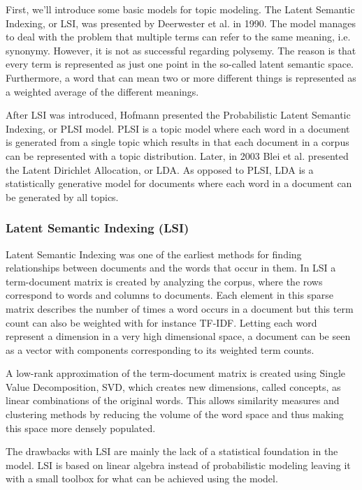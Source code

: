 \documentclass[12pt]{report}
\begin{document}
First, we'll introduce some basic models for topic modeling. The Latent Semantic
Indexing, or LSI, was presented by Deerwester et al. in 1990. The model manages
to deal with the problem that multiple terms can refer to the same meaning,
i.e. synonymy. However, it is not as successful regarding polysemy. The reason
is that every term is represented as just one point in the so-called latent
semantic space. Furthermore, a word that can mean two or more different things
is represented as a weighted average of the different meanings.
 
After LSI was introduced, Hofmann presented the Probabilistic Latent Semantic
Indexing, or PLSI model. PLSI is a topic model where each word in a
document is generated from a single topic which results in that each document
in a corpus can be represented with a topic distribution. Later, in 2003 Blei et
al. presented the Latent Dirichlet Allocation, or LDA. As opposed to PLSI, LDA
is a statistically generative model for documents where each word in a document
can be generated by all topics.

\subsubsection{Latent Semantic Indexing (LSI)}

Latent Semantic Indexing was one of the earliest methods for finding
relationships between documents and the words that occur in them.\cite{Deerwester90indexingby} In LSI a
term-document matrix is created by analyzing the corpus, where the rows
correspond to words and columns to documents. Each element in this sparse
matrix describes the number of times a word occurs in a document but this term
count can also be weighted with for instance TF-IDF. Letting each word
represent a dimension in a very high dimensional space, a document can be seen
as a vector with components corresponding to its weighted term counts.
\cite{Salton:1988:TAA:54259.54260}

A low-rank approximation of the term-document matrix is created using Single
Value Decomposition, SVD, which creates new dimensions, called concepts, as
linear combinations of the original words. This allows similarity measures and
clustering methods by reducing the volume of the word space and thus making
this space more densely populated.

The drawbacks with LSI are mainly the lack of a statistical foundation in the
model. LSI is based on linear algebra instead of probabilistic modeling leaving
it with a small toolbox for what can be achieved using the model.
	
\end{document}
